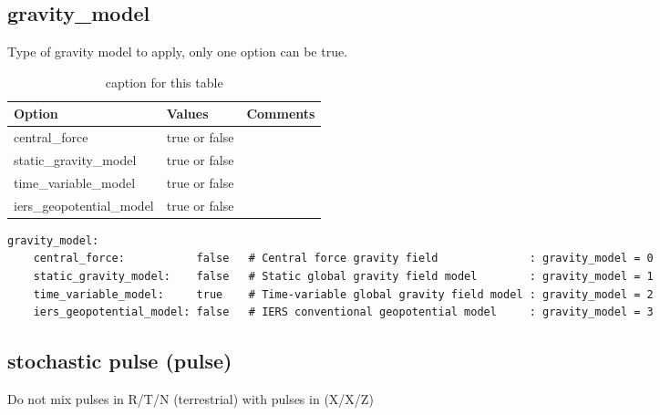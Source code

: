 \subsection{gravity\_model }
Type of gravity model to apply, only one option can be true.
\begin{table}[h!]
	\begin{tabular}{|p{4.5cm}|p{2cm}|p{3.5cm}|}
		\hline
		Option & Values & Comments \\
		\hline
		central\_force            & true or false &  \\ 
		static\_gravity\_model    & true or false &  \\
		time\_variable\_model     & true or false &  \\
		iers\_geopotential\_model & true or false &  \\
		\hline
	\end{tabular}
	\caption{caption for this table}
	\label{table:label_name}
\end{table}
{\small
	\begin{lstlisting}[language=xml,caption=yaml example for gravitational force model options]
gravity_model:
	central_force:           false   # Central force gravity field              : gravity_model = 0
	static_gravity_model:    false   # Static global gravity field model        : gravity_model = 1
	time_variable_model:     true    # Time-variable global gravity field model : gravity_model = 2
	iers_geopotential_model: false   # IERS conventional geopotential model     : gravity_model = 3
    \end{lstlisting}
}
\subsection{stochastic pulse (pulse)}

Do not mix pulses in R/T/N (terrestrial) with pulses in (X/X/Z)


